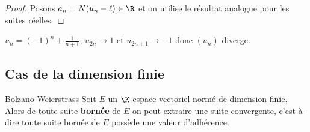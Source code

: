 \begin{proof}
    Posons $a_n = N(u_n - \ell) \in \R$ et on utilise le résultat analogue pour les suites réelles.
\end{proof}

\begin{exemple}
    $u_n = (-1)^n + \frac 1 {n+1}$, $u_{2n} \to 1$ et $u_{2n + 1} \to -1$ donc $(u_n)$ diverge.
\end{exemple}

\subsection{Cas de la dimension finie}

\begin{theoreme}{Bolzano-Weierstrass}{}
    Soit $E$ un $\K$-espace vectoriel normé de dimension finie. Alors de toute suite
    \textbf{bornée} de $E$ on peut extraire une suite convergente, c'est-à-dire toute 
    suite bornée de $E$ possède une valeur d'adhérence. 
\end{theoreme}


